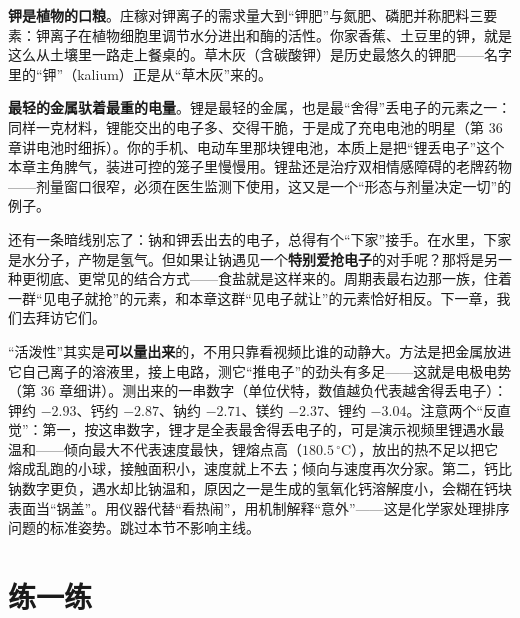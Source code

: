 \textbf{钾是植物的口粮}。庄稼对钾离子的需求量大到“钾肥”与氮肥、磷肥并称肥料三要素：钾离子在植物细胞里调节水分进出和酶的活性。你家香蕉、土豆里的钾，就是这么从土壤里一路走上餐桌的。草木灰（含碳酸钾）是历史最悠久的钾肥——名字里的“钾”（kalium）正是从“草木灰”来的。

\textbf{最轻的金属驮着最重的电量}。锂是最轻的金属，也是最“舍得”丢电子的元素之一：同样一克材料，锂能交出的电子多、交得干脆，于是成了充电电池的明星（第 36 章讲电池时细拆）。你的手机、电动车里那块锂电池，本质上是把“锂丢电子”这个本章主角脾气，装进可控的笼子里慢慢用。锂盐还是治疗双相情感障碍的老牌药物——剂量窗口很窄，必须在医生监测下使用，这又是一个“形态与剂量决定一切”的例子。

还有一条暗线别忘了：钠和钾丢出去的电子，总得有个“下家”接手。在水里，下家是水分子，产物是氢气。但如果让钠遇见一个\textbf{特别爱抢电子}的对手呢？那将是另一种更彻底、更常见的结合方式——食盐就是这样来的。周期表最右边那一族，住着一群“见电子就抢”的元素，和本章这群“见电子就让”的元素恰好相反。下一章，我们去拜访它们。

\begin{tiaozhan}
“活泼性”其实是\textbf{可以量出来}的，不用只靠看视频比谁的动静大。方法是把金属放进它自己离子的溶液里，接上电路，测它“推电子”的劲头有多足——这就是电极电势（第 36 章细讲）。测出来的一串数字（单位伏特，数值越负代表越舍得丢电子）：钾约 $-2.93$、钙约 $-2.87$、钠约 $-2.71$、镁约 $-2.37$、锂约 $-3.04$。注意两个“反直觉”：第一，按这串数字，锂才是全表最舍得丢电子的，可是演示视频里锂遇水最温和——倾向最大不代表速度最快，锂熔点高（$180.5\,^{\circ}\mathrm{C}$），放出的热不足以把它熔成乱跑的小球，接触面积小，速度就上不去；倾向与速度再次分家。第二，钙比钠数字更负，遇水却比钠温和，原因之一是生成的氢氧化钙溶解度小，会糊在钙块表面当“锅盖”。用仪器代替“看热闹”，用机制解释“意外”——这是化学家处理排序问题的标准姿势。跳过本节不影响主线。
\end{tiaozhan}

\section*{练一练}

